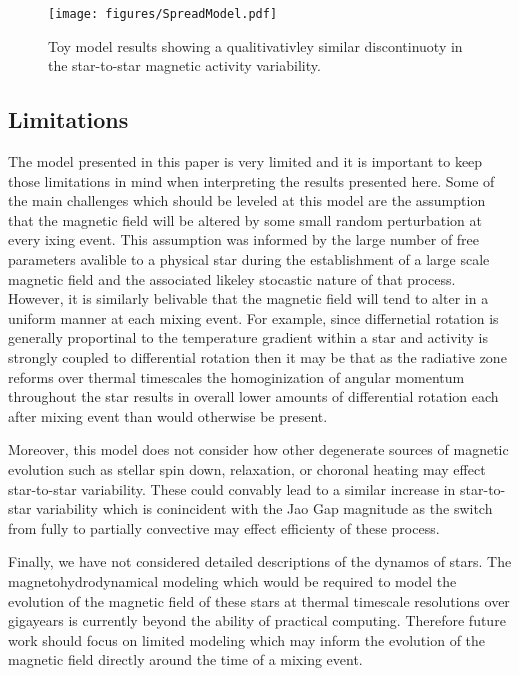 \begin{figure}
  \centering
  \texttt{[image: figures/SpreadModel.pdf]}
  \caption{Toy model results showing a qualitivativley similar discontinuoty in the star-to-star magnetic activity variability.}
  \label{fig:model}
\end{figure}

\subsection{Limitations}
The model presented in this paper is very limited and it is important to keep
those limitations in mind when interpreting the results presented here. Some of
the main challenges which should be leveled at this model are the assumption
that the magnetic field will be altered by some small random perturbation at
every ixing event. This assumption was informed by the large number of free
parameters avalible to a physical star during the establishment of a large scale 
magnetic field and the associated likeley stocastic nature of that process.
However, it is similarly belivable that the magnetic field will tend to alter in
a uniform manner at each mixing event. For example, since differnetial rotation
is generally proportinal to the temperature gradient within a star and activity is
strongly coupled to differential rotation then it may be that as the radiative zone reforms over thermal timescales the homoginization of angular momentum throughout the star results in overall lower amounts of differential rotation each after mixing event than would otherwise be present.

Moreover, this model does not consider how other degenerate sources of magnetic evolution such as stellar spin down, relaxation, or choronal heating may effect star-to-star variability. These could convably lead to a similar increase in star-to-star variability which is conincident with the Jao Gap magnitude as the switch from fully to partially convective may effect efficienty of these process.

Finally, we have not considered detailed descriptions of the dynamos of stars. The magnetohydrodynamical modeling which would be required to model the evolution of the magnetic field of these stars at thermal timescale resolutions over gigayears is currently beyond the ability of practical computing. Therefore future work should focus on limited modeling which may inform the evolution of the magnetic field directly around the time of a mixing event.
